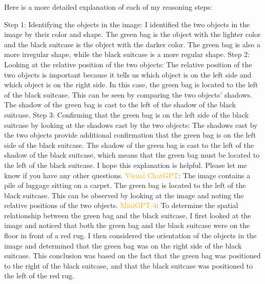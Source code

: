 \begin{enumerate}
        Here is a more detailed explanation of each of my reasoning steps:
        
        Step 1: Identifying the objects in the image: I identified the two objects in the image by their color and shape. The green bag is the object with the lighter color and the black suitcase is the object with the darker color. The green bag is also a more irregular shape, while the black suitcase is a more regular shape.
        Step 2: Looking at the relative position of the two objects: The relative position of the two objects is important because it tells us which object is on the left side and which object is on the right side. In this case, the green bag is located to the left of the black suitcase. This can be seen by comparing the two objects' shadows. The shadow of the green bag is cast to the left of the shadow of the black suitcase.
        Step 3: Confirming that the green bag is on the left side of the black suitcase by looking at the shadows cast by the two objects: The shadows cast by the two objects provide additional confirmation that the green bag is on the left side of the black suitcase. The shadow of the green bag is cast to the left of the shadow of the black suitcase, which means that the green bag must be located to the left of the black suitcase.
        I hope this explanation is helpful. Please let me know if you have any other questions.
        \subitem \textcolor{orange}{Visual ChatGPT}: The image contains a pile of luggage sitting on a carpet. The green bag is located to the left of the black suitcase. This can be observed by looking at the image and noting the relative positions of the two objects.
        \subitem \textcolor{orange}{MiniGPT-4}: To determine the spatial relationship between the green bag and the black suitcase, I first looked at the image and noticed that both the green bag and the black suitcase were on the floor in front of a red rug. I then considered the orientation of the objects in the image and determined that the green bag was on the right side of the black suitcase. This conclusion was based on the fact that the green bag was positioned to the right of the black suitcase, and that the black suitcase was positioned to the left of the red rug.
    \end{enumerate}
